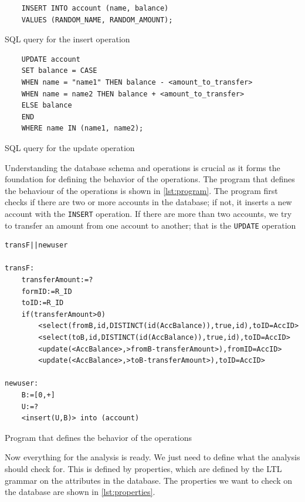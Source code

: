 \begin{listing}[htb!]
\begin{verbatim}
    INSERT INTO account (name, balance)
    VALUES (RANDOM_NAME, RANDOM_AMOUNT);
\end{verbatim}
\label{lst:sql-queries}
\caption{SQL query for the insert operation}
\end{listing}


\begin{listing}[htb!]
\begin{verbatim}
    UPDATE account
    SET balance = CASE
    WHEN name = "name1" THEN balance - <amount_to_transfer>
    WHEN name = name2 THEN balance + <amount_to_transfer>
    ELSE balance
    END
    WHERE name IN (name1, name2);
\end{verbatim}
\caption{SQL query for the update operation}
\label{lst:sql-queries2}
\end{listing}

Understanding the database schema and operations is crucial as it forms the foundation for defining the behavior of the operations.
The program that defines the behaviour of the operations is shown in \autoref{lst:program}.
The program first checks if there are two or more accounts in the database; if not, it inserts a new account with the \texttt{INSERT} operation.
If there are more than two accounts, we try to transfer an amount from one account to another; that is the \texttt{UPDATE} operation

\begin{listing}[htb!]
\begin{verbatim}
transF||newuser

transF:
    transferAmount:=?
    formID:=R_ID
    toID:=R_ID
    if(transferAmount>0)
        <select(fromB,id,DISTINCT(id(AccBalance)),true,id),toID=AccID>
        <select(toB,id,DISTINCT(id(AccBalance)),true,id),toID=AccID>
        <update(<AccBalance>,>fromB-transferAmount>),fromID=AccID>
        <update(<AccBalance>,>toB-transferAmount>),toID=AccID>

newuser:
    B:=[0,+]
    U:=?
    <insert(U,B)> into (account)
\end{verbatim}
\caption{Program that defines the behavior of the operations}
\label{lst:program}
\end{listing}


Now everything for the analysis is ready.
We just need to define what the analysis should check for.
This is defined by properties, which are defined by the LTL grammar on the attributes in the database.
The properties we want to check on the database are shown in \autoref{lst:properties}.

